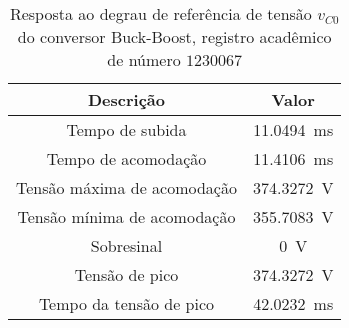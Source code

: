 \begin{table}[!ht]
\centering
\caption{Resposta ao degrau de referência de tensão $v_{C0}$ do conversor Buck-Boost, registro acadêmico de número $1230067$}
\label{tab:parametros}
\begin{tabular}{@{}cc@{}}
\toprule
\textbf{Descrição} & \textbf{Valor}\\ \midrule
Tempo de subida & \SI{11.0494}{\milli\s}\\
Tempo de acomodação & \SI{11.4106}{\milli\s}\\
Tensão máxima de acomodação & \SI{374.3272}{\V}\\
Tensão mínima de acomodação & \SI{355.7083}{\V}\\
Sobresinal & \SI{0}{\V}\\
Tensão de pico & \SI{374.3272}{\V}\\
Tempo da tensão de pico & \SI{42.0232}{\milli\s}\\
\bottomrule
\end{tabular}
\end{table}

